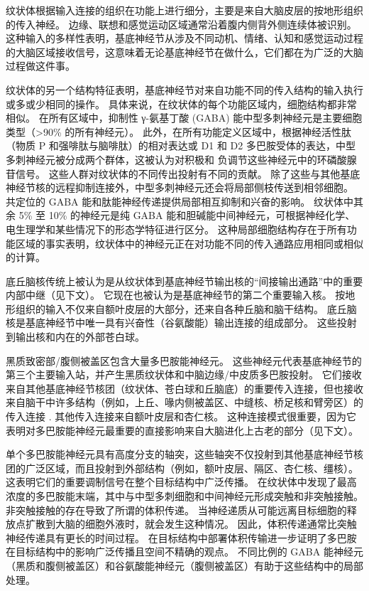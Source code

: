 纹状体根据输入连接的组织在功能上进行细分，主要是来自大脑皮层的按地形组织的传入神经。 边缘、联想和感觉运动区域通常沿着腹内侧背外侧连续体被识别。 这种输入的多样性表明，基底神经节从涉及不同动机、情绪、认知和感觉运动过程的大脑区域接收信号，这意味着无论基底神经节在做什么，它们都在为广泛的大脑过程做这件事。

纹状体的另一个结构特征表明，基底神经节对来自功能不同的传入结构的输入执行或多或少相同的操作。 具体来说，在纹状体的每个功能区域内，细胞结构都非常相似。 在所有区域中，抑制性 γ-氨基丁酸 (GABA) 能中型多刺神经元是主要细胞类型（>90\% 的所有神经元）。 此外，在所有功能定义区域中，根据神经活性肽（物质 P 和强啡肽与脑啡肽）的相对表达或 D1 和 D2 多巴胺受体的表达，中型多刺神经元被分成两个群体，这被认为对积极和 负调节这些神经元中的环磷酸腺苷信号。 这些人群对纹状体的不同传出投射有不同的贡献。 除了这些与其他基底神经节核的远程抑制连接外，中型多刺神经元还会将局部侧枝传送到相邻细胞。 共定位的 GABA 能和肽能神经传递提供局部相互抑制和兴奋的影响。 纹状体中其余 5\% 至 10\% 的神经元是纯 GABA 能和胆碱能中间神经元，可根据神经化学、电生理学和某些情况下的形态学特征进行区分。 这种局部细胞结构存在于所有功能区域的事实表明，纹状体中的神经元正在对功能不同的传入通路应用相同或相似的计算。

底丘脑核传统上被认为是从纹状体到基底神经节输出核的“间接输出通路”中的重要内部中继（见下文）。 它现在也被认为是基底神经节的第二个重要输入核。 按地形组织的输入不仅来自额叶皮层的大部分，还来自各种丘脑和脑干结构。 底丘脑核是基底神经节中唯一具有兴奋性（谷氨酸能）输出连接的组成部分。 这些投射到输出核和内在的外部苍白球。

黑质致密部/腹侧被盖区包含大量多巴胺能神经元。 这些神经元代表基底神经节的第三个主要输入站，并产生黑质纹状体和中脑边缘/中皮质多巴胺投射。 它们接收来自其他基底神经节核团（纹状体、苍白球和丘脑底）的重要传入连接，但也接收来自脑干中许多结构（例如，上丘、喙内侧被盖区、中缝核、桥足核和臂旁区）的传入连接 . 其他传入连接来自额叶皮层和杏仁核。 这种连接模式很重要，因为它表明对多巴胺能神经元最重要的直接影响来自大脑进化上古老的部分（见下文）。

单个多巴胺能神经元具有高度分支的轴突，这些轴突不仅投射到其他基底神经节核团的广泛区域，而且投射到外部结构（例如，额叶皮层、隔区、杏仁核、缰核）。 这表明它们的重要调制信号在整个目标结构中广泛传播。 在纹状体中发现了最高浓度的多巴胺能末端，其中与中型多刺细胞和中间神经元形成突触和非突触接触。 非突触接触的存在导致了所谓的体积传递。 当神经递质从可能远离目标细胞的释放点扩散到大脑的细胞外液时，就会发生这种情况。 因此，体积传递通常比突触神经传递具有更长的时间过程。 在目标结构中部署体积传输进一步证明了多巴胺在目标结构中的影响广泛传播且空间不精确的观点。 不同比例的 GABA 能神经元（黑质和腹侧被盖区）和谷氨酸能神经元（腹侧被盖区）有助于这些结构中的局部处理。

